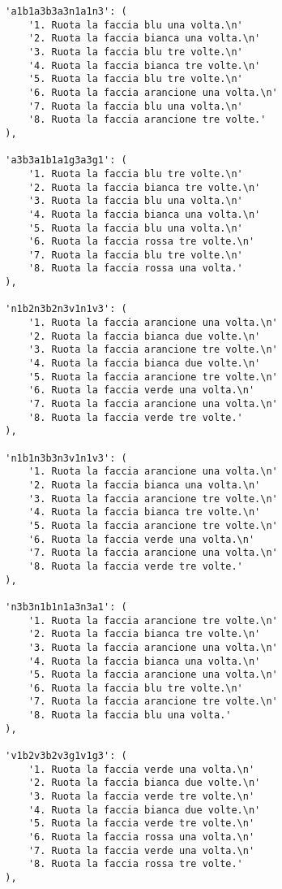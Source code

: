 \begin{lstlisting}
        'a1b1a3b3a3n1a1n3': (
            '1. Ruota la faccia blu una volta.\n'
            '2. Ruota la faccia bianca una volta.\n'
            '3. Ruota la faccia blu tre volte.\n'
            '4. Ruota la faccia bianca tre volte.\n'
            '5. Ruota la faccia blu tre volte.\n'
            '6. Ruota la faccia arancione una volta.\n'
            '7. Ruota la faccia blu una volta.\n'
            '8. Ruota la faccia arancione tre volte.'
        ),

        'a3b3a1b1a1g3a3g1': (
            '1. Ruota la faccia blu tre volte.\n'
            '2. Ruota la faccia bianca tre volte.\n'
            '3. Ruota la faccia blu una volta.\n'
            '4. Ruota la faccia bianca una volta.\n'
            '5. Ruota la faccia blu una volta.\n'
            '6. Ruota la faccia rossa tre volte.\n'
            '7. Ruota la faccia blu tre volte.\n'
            '8. Ruota la faccia rossa una volta.'
        ),

        'n1b2n3b2n3v1n1v3': (
            '1. Ruota la faccia arancione una volta.\n'
            '2. Ruota la faccia bianca due volte.\n'
            '3. Ruota la faccia arancione tre volte.\n'
            '4. Ruota la faccia bianca due volte.\n'
            '5. Ruota la faccia arancione tre volte.\n'
            '6. Ruota la faccia verde una volta.\n'
            '7. Ruota la faccia arancione una volta.\n'
            '8. Ruota la faccia verde tre volte.'
        ),

        'n1b1n3b3n3v1n1v3': (
            '1. Ruota la faccia arancione una volta.\n'
            '2. Ruota la faccia bianca una volta.\n'
            '3. Ruota la faccia arancione tre volte.\n'
            '4. Ruota la faccia bianca tre volte.\n'
            '5. Ruota la faccia arancione tre volte.\n'
            '6. Ruota la faccia verde una volta.\n'
            '7. Ruota la faccia arancione una volta.\n'
            '8. Ruota la faccia verde tre volte.'
        ),

        'n3b3n1b1n1a3n3a1': (
            '1. Ruota la faccia arancione tre volte.\n'
            '2. Ruota la faccia bianca tre volte.\n'
            '3. Ruota la faccia arancione una volta.\n'
            '4. Ruota la faccia bianca una volta.\n'
            '5. Ruota la faccia arancione una volta.\n'
            '6. Ruota la faccia blu tre volte.\n'
            '7. Ruota la faccia arancione tre volte.\n'
            '8. Ruota la faccia blu una volta.'
        ),

        'v1b2v3b2v3g1v1g3': (
            '1. Ruota la faccia verde una volta.\n'
            '2. Ruota la faccia bianca due volte.\n'
            '3. Ruota la faccia verde tre volte.\n'
            '4. Ruota la faccia bianca due volte.\n'
            '5. Ruota la faccia verde tre volte.\n'
            '6. Ruota la faccia rossa una volta.\n'
            '7. Ruota la faccia verde una volta.\n'
            '8. Ruota la faccia rossa tre volte.'
        ),


\end{lstlisting}
